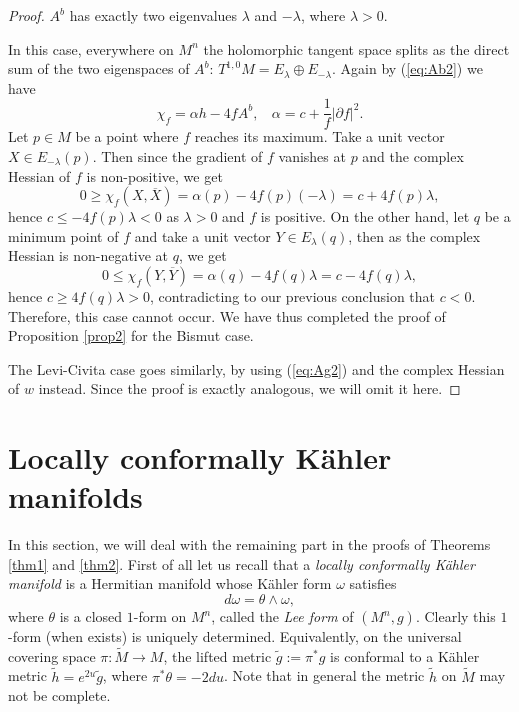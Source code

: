 \documentclass{amsart}
\numberwithin{equation}{section}
\begin{document}
\begin{proof}
\vspace{0.1cm}

 $A^b$ has exactly two eigenvalues $\lambda$ and $-\lambda$, where $\lambda >0$.

In this case, everywhere on $M^n$ the holomorphic tangent space splits as the direct sum of the two eigenspaces of $A^b$: $T^{1,0}M=E_{\lambda} \oplus E_{-\lambda}$. Again by (\ref{eq:Ab2}) we have
$$ \chi_f = \alpha h - 4fA^b, \ \ \ \ \alpha = c+\frac{1}{f}|\partial f|^2. $$
Let $p\in M$ be a point where $f$ reaches its maximum. Take a unit vector $X\in E_{-\lambda}(p)$. Then since the gradient of $f$ vanishes at $p$ and the complex Hessian of $f$ is non-positive, we get
$$ 0 \geq \chi_f(X,\overline{X}) = \alpha (p) -4f(p)(-\lambda) = c+4f(p)\lambda, $$
hence $c\leq -4f(p)\lambda <0$ as $\lambda >0$ and $f$ is positive. On the other hand, let $q$ be a minimum point of $f$ and take a unit vector $Y\in E_{\lambda }(q)$, then as the complex Hessian is non-negative at $q$, we get
$$ 0 \leq \chi_f(Y,\overline{Y}) = \alpha (q) - 4f(q)\lambda = c-4f(q)\lambda, $$
hence $c\geq 4f(q)\lambda >0$, contradicting to our previous conclusion that $c<0$. Therefore, this case cannot occur. We have thus completed the proof of Proposition \ref{prop2} for the Bismut case.

The Levi-Civita case goes similarly, by using (\ref{eq:Ag2}) and the complex Hessian of $w$ instead. Since the proof is exactly analogous, we will omit it here.
\end{proof}






\vspace{0.3cm}

\section{Locally conformally K\"ahler manifolds}

In this section, we will deal with the remaining part in the proofs of Theorems \ref{thm1} and \ref{thm2}.  First of all let us recall that a {\em locally conformally K\"ahler manifold} is a Hermitian manifold whose K\"ahler form $\omega$ satisfies
\begin{equation}
 d\omega = \theta \wedge \omega ,
\end{equation}
where $\theta$ is a closed $1$-form on $M^n$, called the {\em Lee form} of $(M^n,g)$. Clearly this $1$-form (when exists) is uniquely determined. Equivalently, on the universal covering space $\pi : \widetilde{M} \rightarrow M$, the lifted metric $\widetilde{g}:=\pi^{\ast}\!g$ is conformal to a K\"ahler metric $\widetilde h=e^{2u}\widetilde{g}$, where $\pi^{\ast}\theta = -2du$. Note that in general the metric $\widetilde h$ on $\widetilde{M}$ may not be complete.
\end{document}
